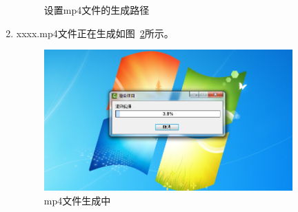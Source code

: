 \documentclass[12pt]{article}
\begin{document}
\begin{enumerate}
\begin{figure}
    \caption{设置mp4文件的生成路径}
    \label{fig:fig9}
    \end{figure}
\item xxxx.mp4文件正在生成如图~\ref{fig:fig10}所示。
     \begin{figure}
    \centering
    \includegraphics[width=0.9\textwidth]{fig10.png}
    \caption{mp4文件生成中}
    \label{fig:fig10}
    \end{figure}
\end{enumerate}
\end{document}
